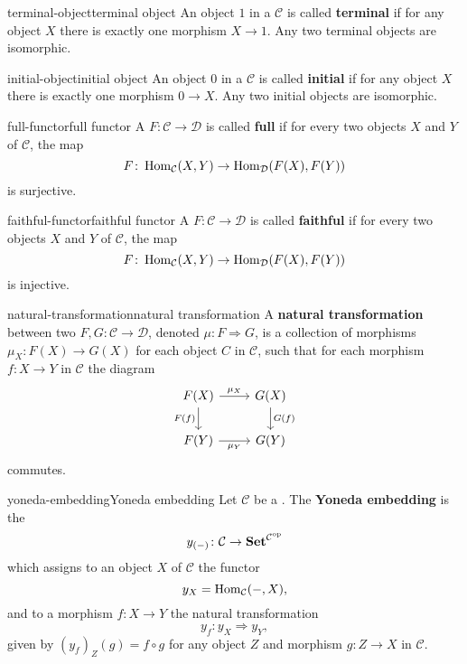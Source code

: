 \begin{topic}{terminal-object}{terminal object}
    An object $1$ in a  $\mathcal{C}$ is called \textbf{terminal} if for any object $X$ there is exactly one morphism $X \to 1$. Any two terminal objects are isomorphic.
\end{topic}

\begin{topic}{initial-object}{initial object}
    An object $0$ in a  $\mathcal{C}$ is called \textbf{initial} if for any object $X$ there is exactly one morphism $0 \to X$. Any two initial objects are isomorphic.
\end{topic}

\begin{topic}{full-functor}{full functor}
    A  $F \colon \mathcal{C} \to \mathcal{D}$ is called \textbf{full} if for every two objects $X$ and $Y$ of $\mathcal{C}$, the map
    \[ F \colon \operatorname{Hom}_{\mathcal{C}}(X, Y) \to \operatorname{Hom}_{\mathcal{D}}(F(X), F(Y)) \]
    is surjective.
\end{topic}

\begin{topic}{faithful-functor}{faithful functor}
    A  $F \colon \mathcal{C} \to \mathcal{D}$ is called \textbf{faithful} if for every two objects $X$ and $Y$ of $\mathcal{C}$, the map
    \[ F \colon \operatorname{Hom}_{\mathcal{C}}(X, Y) \to \operatorname{Hom}_{\mathcal{D}}(F(X), F(Y)) \]
    is injective.
\end{topic}

\begin{topic}{natural-transformation}{natural transformation}
    A \textbf{natural transformation} between two  $F, G \colon \mathcal{C} \to \mathcal{D}$, denoted $\mu \colon F \Rightarrow G$, is a collection of morphisms $\mu_X \colon F(X) \to G(X)$ for each object $C$ in $\mathcal{C}$, such that for each morphism $f \colon X \to Y$ in $\mathcal{C}$ the diagram
    \[ \svg \begin{tikzcd} F(X) \arrow{r}{\mu_X} \arrow[swap]{d}{F(f)} & G(X) \arrow{d}{G(f)} \\ F(Y) \arrow[swap]{r}{\mu_Y} & G(Y) \end{tikzcd} \]
    commutes. 
\end{topic}

\begin{topic}{yoneda-embedding}{Yoneda embedding}
    Let $\mathcal{C}$ be a . The \textbf{Yoneda embedding} is the 
    \[ y_{(-)} \colon \mathcal{C} \to \textbf{Set}^{\mathcal{C}^\textup{op}} \]
    which assigns to an object $X$ of $\mathcal{C}$ the functor
    \[ y_X = \operatorname{Hom}_{\mathcal{C}}(-, X) , \]
    and to a morphism $f \colon X \to Y$ the natural transformation
    \[ y_f : y_X \Rightarrow y_Y , \]
    given by $(y_f)_Z(g) = f \circ g$ for any object $Z$ and morphism $g \colon Z \to X$ in $\mathcal{C}$.
\end{topic}

